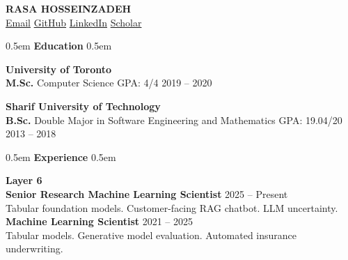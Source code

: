 \documentclass[11pt,a4paper]{article}
\newcommand{\cvsection}[1]{%
    \vspace{10pt}
    \noindent\hfill\kern0.5em
    {\Huge \textbf{\textcolor{maincolor}{#1}}}%
    \kern0.5em\hfill\vspace{8pt}
}
\begin{document}
\RaggedRight %

\begin{center}
    {\Huge \textbf{\MakeUppercase{Rasa Hosseinzadeh}}} \\[5pt]
    \href{mailto:rasa.hosseinzadeh@gmail.com}{\textcolor{maincolor}{\faEnvelope}\hspace{0.5em} Email} \hspace{1.5em}
    \href{https://github.com/rasaHosseinzadeh}{\textcolor{maincolor}{\faGithub}\hspace{0.5em} GitHub} \hspace{1.5em}
    \href{https://linkedin.com/in/rasa-hosseinzadeh-6204a6208}{\textcolor{maincolor}{\faLinkedin}\hspace{0.5em} LinkedIn} \hspace{1.5em}
    \href{https://scholar.google.com/citations?user=1Evd7mYAAAAJ}{\textcolor{maincolor}{\faGraduationCap}\hspace{0.5em} Scholar}
\end{center}
\vspace{15pt}

\cvsection{Education}

{\Large \textbf{\textcolor{maincolor}{University of Toronto}}} \\
\textbf{M.Sc.} \hspace{1.4em} Computer Science \hspace{18.0em} GPA: 4/4 \hfill 2019 -- 2020 \\
\vspace{8pt}

{\Large \textbf{\textcolor{maincolor}{Sharif University of Technology}}} \\
\textbf{B.Sc.} \hspace{1.7em} Double Major in Software Engineering and Mathematics \hfill GPA: 19.04/20 \hfill 2013 -- 2018 \\
\vspace{15pt}

\cvsection{Experience}


{\Large \textbf{\textcolor{maincolor}{Layer 6}}} \\
\textbf{Senior Research Machine Learning Scientist} \hfill 2025 -- Present \\
{\small Tabular foundation models. Customer-facing RAG chatbot. LLM uncertainty.} \\[4pt]
\textbf{Machine Learning Scientist} \hfill 2021 -- 2025 \\
{\small Tabular models. Generative model evaluation. Automated insurance underwriting.} \\
\vspace{10pt}
\end{document}
